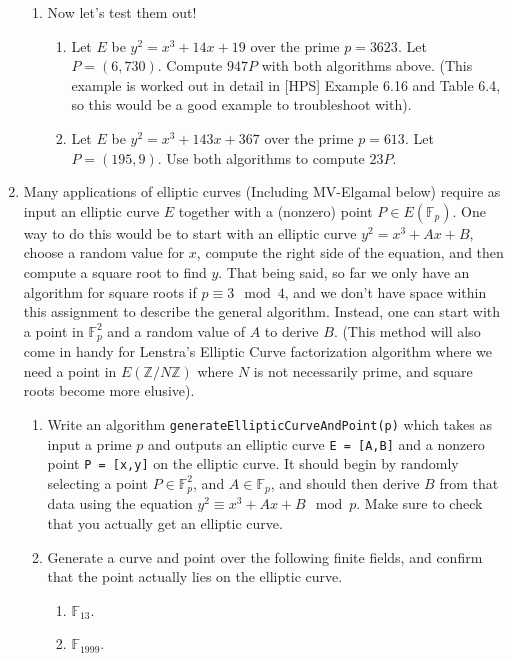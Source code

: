 \documentclass[11pt]{article}
\newcommand{\bF}{\mathbb{F}}
\newcommand{\bZ}{\mathbb{Z}}
\begin{document}
\begin{enumerate}
{\begin{enumerate}
{    }
    \item{Now let's test them out!
    \begin{enumerate}
      \item{
      Let $E$ be $y^2 = x^3 + 14x + 19$ over the prime $p = 3623$.  Let $P = (6,730)$.  Compute $947P$ with both algorithms above.  (This example is worked out in detail in [HPS] Example 6.16 and Table 6.4, so this would be a good example to troubleshoot with).
      }
      \item{
      Let $E$ be $y^2 = x^3 + 143x + 367$ over the prime $p=613$.  Let $P = (195,9)$.  Use both algorithms to compute $23P$.
      }
    \end{enumerate}
    }
  \end{enumerate}
  }
  \item{
  Many applications of elliptic curves (Including MV-Elgamal below) require as input an elliptic curve $E$ together with a (nonzero) point $P\in E(\bF_p)$.  One way to do this would be to start with an elliptic curve $y^2 = x^3 + Ax + B$, choose a random value for $x$, compute the right side of the equation, and then compute a square root to find $y$.  That being said, so far we only have an algorithm for square roots if $p\equiv 3\mod 4$, and we don't have space within this assignment to describe the general algorithm.  Instead, one can start with a point in $\bF_p^2$ and a random value of $A$ to derive $B$.  (This method will also come in handy for Lenstra's Elliptic Curve factorization algorithm where we need a point in $E(\bZ/N\bZ)$ where $N$ is not necessarily prime, and square roots become more elusive).
  \begin{enumerate}
    \item{
    Write an algorithm \verb|generateEllipticCurveAndPoint(p)| which takes as input a prime $p$ and outputs an elliptic curve \verb|E = [A,B]| and a nonzero point \verb|P = [x,y]| on the elliptic curve.  It should begin by randomly selecting a point $P\in\bF_p^2$, and $A\in\bF_p$, and should then derive $B$ from that data using the equation $y^2\equiv x^3+Ax+B\mod p$.  Make sure to check that you actually get an elliptic curve.
    }
    \item{
    Generate a curve and point over the following finite fields, and confirm that the point actually lies on the elliptic curve.
    \begin{enumerate}
      \item{$\bF_{13}$.}
      \item{$\bF_{1999}$.}
    \end{enumerate}
}
\end{enumerate}}
\end{enumerate}
\end{document}
